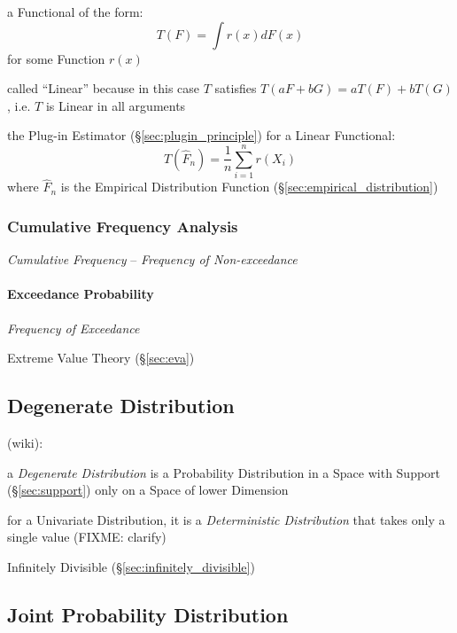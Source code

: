 a Functional of the form:
\[
  T(F) = \int r(x) dF(x)
\]
for some Function $r(x)$

called ``Linear'' because in this case $T$ satisfies
$T(aF + bG) = aT(F) + bT(G)$, i.e. $T$ is Linear in all arguments

the Plug-in Estimator (\S\ref{sec:plugin_principle}) for a Linear Functional:
\[
  T(\hat{F}_n) = \frac{1}{n}\sum_{i=1}^n r(X_i)
\]
where $\hat{F}_n$ is the Empirical Distribution Function
(\S\ref{sec:empirical_distribution})



\subsubsection{Cumulative Frequency Analysis}
\label{sec:cumulative_frequency_analysis}

\emph{Cumulative Frequency} -- \emph{Frequency of Non-exceedance}



\paragraph{Exceedance Probability}\label{sec:exceedance_probability}\hfill

\emph{Frequency of Exceedance}

Extreme Value Theory (\S\ref{sec:eva})



\subsection{Degenerate Distribution}\label{sec:degenerate_distribution}

(wiki):

a \emph{Degenerate Distribution} is a Probability Distribution in a Space with
Support (\S\ref{sec:support}) only on a Space of lower Dimension

for a Univariate Distribution, it is a \emph{Deterministic Distribution} that
takes only a single value (FIXME: clarify)

Infinitely Divisible (\S\ref{sec:infinitely_divisible})



\subsection{Joint Probability Distribution}\label{sec:joint_probability}

